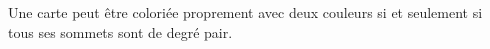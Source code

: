 Une carte peut être coloriée proprement avec deux couleurs si et seulement si tous ses sommets sont de degré pair.
